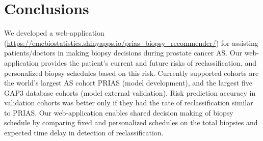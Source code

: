 \section{Conclusions}
We developed a web-application (\url{https://emcbiostatistics.shinyapps.io/prias_biopsy_recommender/}) for assisting patients/doctors in making biopsy decisions during prostate cancer AS. Our web-application provides the patient's current and future risks of reclassification, and personalized biopsy schedules based on this risk. Currently supported cohorts are the world's largest AS cohort PRIAS (model development), and the largest five GAP3 database cohorts (model external validation). Risk prediction accuracy in validation cohorts was better only if they had the rate of reclassification similar to PRIAS. Our web-application enables shared decision making of biopsy schedule by comparing fixed and personalized schedules on the total biopsies and expected time delay in detection of reclassification.